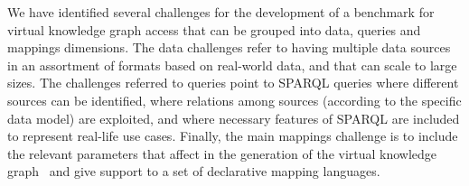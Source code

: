 

We have identified several challenges for the development of a benchmark for virtual knowledge graph access that can be grouped into data, queries and mappings dimensions. The data challenges refer to having multiple data sources in an assortment of formats based on real-world data, and that can scale to large sizes. The challenges referred to queries point to SPARQL queries where different sources can be identified, where relations among sources (according to the specific data model) are exploited, and where necessary features of SPARQL are included to represent real-life use cases. Finally, the main mappings challenge is to include the relevant parameters that affect in the generation of the virtual knowledge graph~\citep{chaves2019what} and give support to a set of declarative mapping languages.


